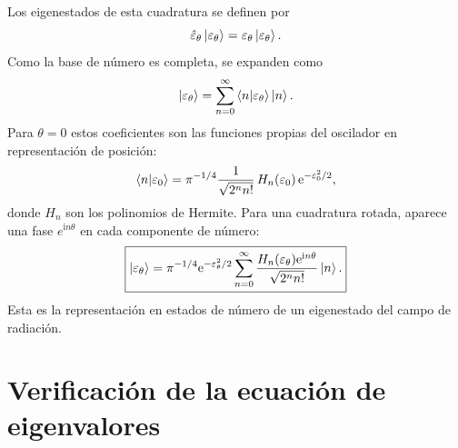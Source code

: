 \documentclass[11pt]{article}
\newcommand{\ii}{\mathrm{i}}
\newcommand{\ee}{\mathrm{e}}
\begin{document}
Los eigenestados de esta cuadratura se definen por
\begin{equation}
  \hat\varepsilon_\theta\ket{\varepsilon_\theta}
  =
  \varepsilon_\theta\ket{\varepsilon_\theta}.
\end{equation}
Como la base de n\'umero es completa, se expanden como
\begin{equation}
  \ket{\varepsilon_\theta}
  =
  \sum_{n=0}^{\infty}
  \braket{n|\varepsilon_\theta}\ket n.
\end{equation}
Para $\theta=0$ estos coeficientes son las funciones propias del oscilador en
representaci\'on de posici\'on:
\begin{equation}
  \braket{n|\varepsilon_0}
  =
  \pi^{-1/4}
  \frac{1}{\sqrt{2^n n!}}\,
  H_n(\varepsilon_0)\,
  \ee^{-\varepsilon_0^2/2},
\end{equation}
donde $H_n$ son los polinomios de Hermite. Para una cuadratura rotada, aparece
una fase $e^{\ii n\theta}$ en cada componente de n\'umero:
\begin{equation}
  \boxed{
  \ket{\varepsilon_\theta}
  =
  \pi^{-1/4}\ee^{-\varepsilon_\theta^2/2}
  \sum_{n=0}^{\infty}
  \frac{H_n(\varepsilon_\theta)\ee^{\ii n\theta}}
       {\sqrt{2^n n!}}\ket n.
  }
\end{equation}
Esta es la representaci\'on en estados de n\'umero de un eigenestado del campo
de radiaci\'on.

\section{Verificaci\'on de la ecuaci\'on de eigenvalores}
\end{document}
